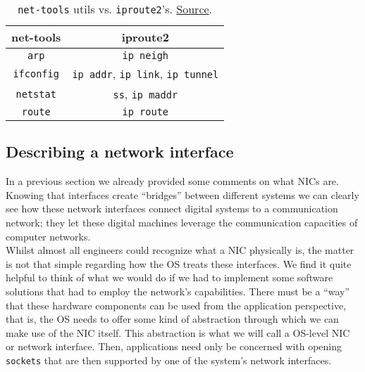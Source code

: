             \begin{table}
                \centering
                \begin{tabular}{|c|c|}
                    \hline
                    \textbf{net-tools} & \textbf{iproute2}\\
                    \hline
                    \texttt{arp} & \texttt{ip neigh}\\
                    \hline
                    \texttt{ifconfig} & \texttt{ip addr}, \texttt{ip link}, \texttt{ip tunnel}\\
                    \hline
                    \texttt{netstat} & \texttt{ss}, \texttt{ip maddr}\\
                    \hline
                    \texttt{route} & \texttt{ip route}\\
                    \hline
                \end{tabular}
                \caption{\texttt{net-tools} utils vs. \texttt{iproute2}'s. \href{https://www.thegeekdiary.com/comparing-net-tools-v-s-iproute-package-commands/}{Source}.}
                \label{tab:net-tools-vs-iproute2}
            \end{table}

        \subsection{Describing a network interface}
            In a previous section we already provided some comments on what NICs are. Knowing that interfaces create ``bridges'' between different systems we can clearly see how these network interfaces connect digital systems to a communication network; they let these digital machines leverage the communication capacities of computer networks.\\

            Whilst almost all engineers could recognize what a NIC physically is, the matter is not that simple regarding how the OS treats these interfaces. We find it quite helpful to think of what we would do if we had to implement some software solutions that had to employ the network's capabilities. There must be a ``way'' that these hardware components can be used from the application perspective, that is, the OS needs to offer some kind of abstraction through which we can make use of the NIC itself. This abstraction is what we will call a OS-level NIC or network interface. Then, applications need only be concerned with opening \texttt{sockets} that are then supported by one of the system's network interfaces.\\

